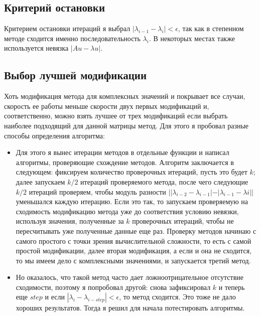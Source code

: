 \documentclass[a4paper,12pt,fleqn]{article}
\begin{document}
\subsection{Критерий остановки}
Критерием остановки итераций я выбрал $|\lambda_{i-1} - \lambda_{i}| < \epsilon$, так как в степенном методе сходится именно последовательность $\lambda_i$. В некоторых местах также используется невязка $|A u - \lambda u|$.\\

\subsection{Выбор лучшей модификации}
Хоть модификация метода для комплексных значений и покрывает все случаи, скорость ее работы меньше скорости двух первых модификаций и, соответственно, можно взять лучшее от трех модификаций если выбрать наиболее подходящий для данной матрицы метод. Для этого я пробовал разные способы определения алгоритма:\\
\begin{itemize}
    \item Для этого я вынес итерации методов в отдельные функции и написал алгоритмы, проверяющие схождение методов. Алгоритм заключается в следующем: фиксируем количество проверочных итераций, пусть это будет $k$; далее запускаем $k/2$ итераций проверяемого метода, после чего следующие $k/2$ итераций проверяем, чтобы модуль разности $||\lambda_{i-2} - \lambda_{i - 1}| - |\lambda_{i - 1} - \lambda{i}||$ уменьшался каждую итерацию. Если это так, то запускаем проверяемую на сходимость модификацию метода уже до соответствия условию невязки, используя значения, полученные за $k$ проверочных итераций, чтобы не пересчитывать уже полученные данные еще раз. Проверку методов начинаю с самого простого с точки зрения вычислительной сложности, то есть с самой простой модификации, далее вторая модификация, а если и она не сходится, то мы имеем дело с комплексными значениями, и запускается третий метод.\\
    \item Но оказалось, что такой метод часто дает ложноотрицательное отсутствие сходимости, поэтому я попробовал другой: снова зафиксировал $k$ и теперь еще $step$ и если $|\lambda_i - \lambda_{i-step}| < \epsilon$, то метод сходится. Это тоже не дало хороших результатов. Тогда я решил для начала потестировать алгоритмы.\\
\end{itemize}
\end{document}
